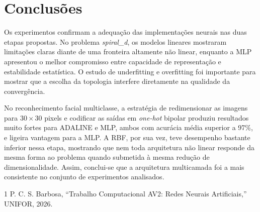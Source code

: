 \documentclass[journal,onecolumn]{IEEEtran}
\begin{document}
\section{Conclusões}
Os experimentos confirmam a adequação das implementações neurais nas duas etapas propostas. No problema \textit{spiral\_d}, os modelos lineares mostraram limitações claras diante de uma fronteira altamente não linear, enquanto a MLP apresentou o melhor compromisso entre capacidade de representação e estabilidade estatística. O estudo de underfitting e overfitting foi importante para mostrar que a escolha da topologia interfere diretamente na qualidade da convergência.

No reconhecimento facial multiclasse, a estratégia de redimensionar as imagens para $30\times30$ pixels e codificar as saídas em \textit{one-hot} bipolar produziu resultados muito fortes para ADALINE e MLP, ambos com acurácia média superior a 97\%, e ligeira vantagem para a MLP. A RBF, por sua vez, teve desempenho bastante inferior nessa etapa, mostrando que nem toda arquitetura não linear responde da mesma forma ao problema quando submetida à mesma redução de dimensionalidade. Assim, conclui-se que a arquitetura multicamada foi a mais consistente no conjunto de experimentos analisados.

\begin{thebibliography}{1}
P. C. S. Barbosa, ``Trabalho Computacional AV2: Redes Neurais Artificiais,'' UNIFOR, 2026.
\end{thebibliography}
\end{document}
